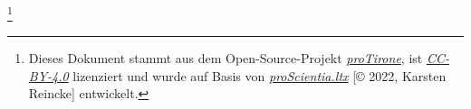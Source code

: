 %
\footnote{Dieses Dokument stammt aus dem Open-Source-Projekt
\textit{\href{https://github.com/protirone/protico.ltx}{proTirone}},
ist \textit{\href{https://creativecommons.org/licenses/by/4.0/}{CC-BY-4.0}} lizenziert 
und wurde auf Basis von \textit{\href{https://github.com/kreincke/proScientia.ltx}{proScientia.ltx}} 
[\copyright{} 2022, Karsten Reincke] entwickelt.}
